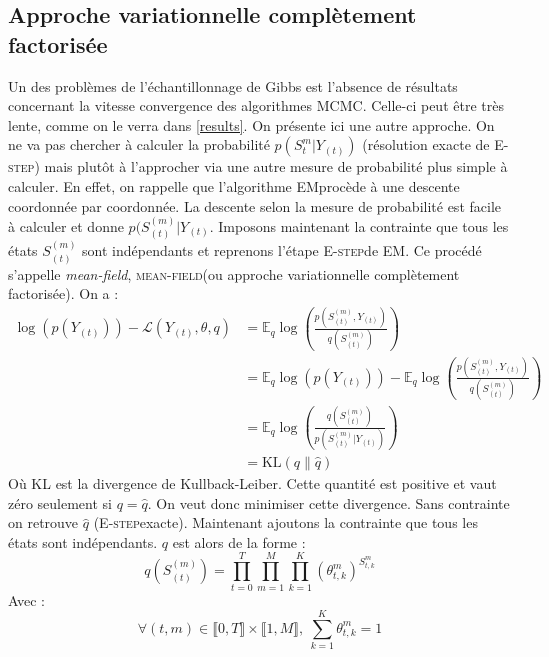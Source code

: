 \documentclass[10pt,a4paper]{article}
\newcommand{\mcmc}{\textsc{MCMC}}
\newcommand{\Estep}{\textsc{E-step}}
\newcommand{\EM}{\textsc{EM}}
\newcommand{\meanfield}{\textsc{mean-field}}
\begin{document}
\subsection{Approche variationnelle complètement factorisée}
Un des problèmes de l'échantillonnage de Gibbs est l'absence de résultats concernant la vitesse convergence des algorithmes \mcmc. Celle-ci peut être très lente, comme on le verra dans \ref{results}. On présente ici une autre approche. On ne va pas chercher à calculer la probabilité $p( S_t^m \vert Y_{(t)})$ (résolution exacte de \Estep) mais plutôt à l'approcher via une autre mesure de probabilité plus simple à calculer. En effet, on rappelle que l'algorithme \EM procède à une descente coordonnée par coordonnée. La descente selon la mesure de probabilité est facile à calculer et donne $p(S_{(t)}^{(m)} \vert Y_{(t)}$. Imposons maintenant la contrainte que tous les états $S_{(t)}^{(m)}$ sont indépendants et reprenons l'étape \Estep de \EM. Ce procédé s'appelle \textit{mean-field}, \meanfield (ou approche variationnelle complètement factorisée). On a :
\begin{equation}
\begin{aligned}
\log(p(Y_{(t)}))-\mathcal{L}(Y_{(t)}, \theta, q)&= \mathbb{E}_q \log \left( \frac{p(S_{(t)}^{(m)}, Y_{(t)})}{q(S_{(t)}^{(m)})}\right)\\
&=\mathbb{E}_q \log(p(Y_{(t)}))-\mathbb{E}_q \log \left( \frac{p(S_{(t)}^{(m)}, Y_{(t)})}{q(S_{(t)}^{(m)})}\right)\\
&=\mathbb{E}_q \log \left( \frac{q(S_{(t)}^{(m)})}{p(S_{(t)}^{(m)} \vert Y_{(t)})} \right) \\
&= \text{KL}(q \| \hat{q})
\end{aligned}
\end{equation}
Où KL est la divergence de Kullback-Leiber. Cette quantité est positive et vaut zéro seulement si $q=\hat{q}$. On veut donc minimiser cette divergence. Sans contrainte on retrouve $\hat{q}$ (\Estep exacte). Maintenant ajoutons la contrainte que tous les états sont indépendants. $q$ est alors de la forme :
\begin{equation}
q(S_{(t)}^{(m)}) = \underset{t=0}{\overset{T}{\prod}} \underset{m=1}{\overset{M}{\prod}} \underset{k=1}{\overset{K}{\prod}} \left( \theta_{t,k}^m \right)^{S_{t,k}^m}
\end{equation}
Avec :
\begin{equation}
\forall (t,m) \in \llbracket 0,T \rrbracket \times \llbracket 1, M \rrbracket, \ \underset{k=1}{\overset{K}{\sum}} \theta_{t,k}^m = 1
\end{equation}
\end{document}
